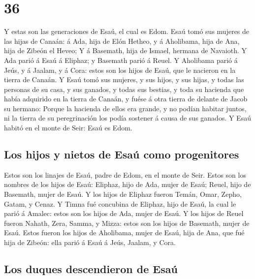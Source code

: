 \hypertarget{section-35}{%
\section{36}\label{section-35}}

 Y estas son las generaciones de Esaú, el cual es Edom.
 Esaú tomó sus mujeres de las hijas de Canaán: á Ada, hija
de Elón Hetheo, y á Aholibama, hija de Ana, hija de Zibeón el Heveo;
 Y á Basemath, hija de Ismael, hermana de Navaioth.
 Y Ada parió á Esaú á Eliphaz; y Basemath parió á Reuel.
 Y Aholibama parió á Jeús, y á Jaalam, y á Cora: estos son
los hijos de Esaú, que le nacieron en la tierra de Canaán. 
Y Esaú tomó sus mujeres, y sus hijos, y sus hijas, y todas las personas
de su casa, y sus ganados, y todas sus bestias, y toda su hacienda que
había adquirido en la tierra de Canaán, y fuése á otra tierra de delante
de Jacob su hermano:  Porque la hacienda de ellos era
grande, y no podían habitar juntos, ni la tierra de su peregrinación los
podía sostener á causa de sus ganados.  Y Esaú habitó en el
monte de Seir: Esaú es Edom.

\hypertarget{los-hijos-y-nietos-de-esauxfa-como-progenitores}{%
\subsection{Los hijos y nietos de Esaú como
progenitores}\label{los-hijos-y-nietos-de-esauxfa-como-progenitores}}

 Estos son los linajes de Esaú, padre de Edom, en el monte
de Seir.  Estos son los nombres de los hijos de Esaú:
Eliphaz, hijo de Ada, mujer de Esaú; Reuel, hijo de Basemath, mujer de
Esaú.  Y los hijos de Eliphaz fueron Temán, Omar, Zepho,
Gatam, y Cenaz.  Y Timna fué concubina de Eliphaz, hijo de
Esaú, la cual le parió á Amalec: estos son los hijos de Ada, mujer de
Esaú.  Y los hijos de Reuel fueron Nahath, Zera, Samma, y
Mizza: estos son los hijos de Basemath, mujer de Esaú. 
Estos fueron los hijos de Aholibama, mujer de Esaú, hija de Ana, que fué
hija de Zibeón: ella parió á Esaú á Jeús, Jaalam, y Cora.

\hypertarget{los-duques-descendieron-de-esauxfa}{%
\subsection{Los duques descendieron de
Esaú}\label{los-duques-descendieron-de-esauxfa}}

